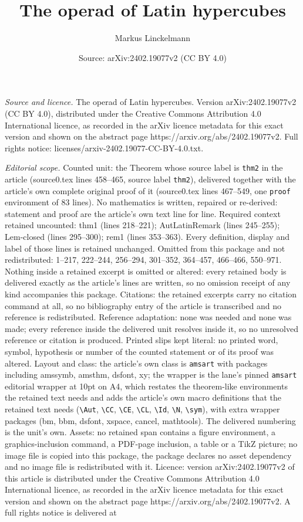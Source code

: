 \documentclass[10pt,a4paper]{amsart}
\title[The operad of Latin hypercubes]{The operad of Latin hypercubes}
\author{Markus Linckelmann}
\date{Source: arXiv:2402.19077v2 (CC BY 4.0)}
\begin{document}
\maketitle

\noindent\emph{Source and licence.} The operad of Latin hypercubes. Version arXiv:2402.19077v2 (CC BY 4.0), distributed under the Creative Commons Attribution 4.0 International licence, as recorded in the arXiv licence metadata for this exact version and shown on the abstract page https://arxiv.org/abs/2402.19077v2. Full rights notice: licenses/arxiv-2402.19077-CC-BY-4.0.txt.\par\smallskip

\noindent\textit{Editorial scope.} Counted unit: the Theorem whose source label is \texttt{thm2} in the article (source0.tex lines 458--465, source label \texttt{thm2}), delivered together with the article's own complete original proof of it (source0.tex lines 467--549, one \texttt{proof} environment of 83 lines). No mathematics is written, repaired or re-derived: statement and proof are the article's own text line for line. Required context retained uncounted: thm1 (lines 218--221); AutLatinRemark (lines 245--255); Lem-closed (lines 295--300); rem1 (lines 353--363). Every definition, display and label of those lines is retained unchanged. Omitted from this package and not redistributed: 1--217, 222--244, 256--294, 301--352, 364--457, 466--466, 550--971. Nothing inside a retained excerpt is omitted or altered: every retained body is delivered exactly as the article's lines are written, so no omission receipt of any kind accompanies this package. Citations: the retained excerpts carry no citation command at all, so no bibliography entry of the article is transcribed and no reference is redistributed. Reference adaptation: none was needed and none was made; every reference inside the delivered unit resolves inside it, so no unresolved reference or citation is produced. Printed slips kept literal: no printed word, symbol, hypothesis or number of the counted statement or of its proof was altered. Layout and class: the article's own class is \texttt{amsart} with packages including amssymb, amsthm, dsfont, xy; the wrapper is the lane's pinned \texttt{amsart} editorial wrapper at 10pt on A4, which restates the theorem-like environments the retained text needs and adds the article's own macro definitions that the retained text needs (\texttt{\textbackslash Aut}, \texttt{\textbackslash CC}, \texttt{\textbackslash CE}, \texttt{\textbackslash CL}, \texttt{\textbackslash Id}, \texttt{\textbackslash N}, \texttt{\textbackslash sym}), with extra wrapper packages (bm, bbm, dsfont, xspace, cancel, mathtools). The delivered numbering is the unit's own. Assets: no retained span contains a figure environment, a graphics-inclusion command, a PDF-page inclusion, a table or a TikZ picture; no image file is copied into this package, the package declares no asset dependency and no image file is redistributed with it. Licence: version arXiv:2402.19077v2 of this article is distributed under the Creative Commons Attribution 4.0 International licence, as recorded in the arXiv licence metadata for this exact version and shown on the abstract page https://arxiv.org/abs/2402.19077v2. A full rights notice is delivered at 
\end{document}
